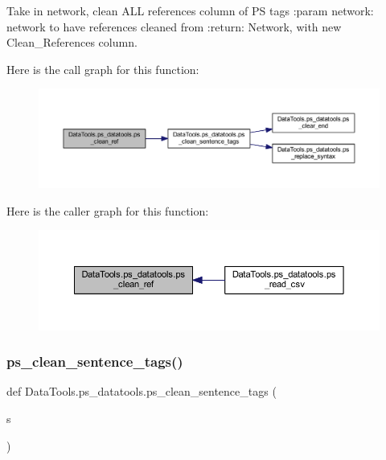\begin{DoxyVerb}Take in network, clean ALL references column of PS tags
:param network: network to have references cleaned from
:return: Network, with new Clean_References column.
\end{DoxyVerb}
 Here is the call graph for this function\+:
\nopagebreak
\begin{figure}[H]
\begin{center}
\leavevmode
\includegraphics[width=350pt]{namespace_data_tools_1_1ps__datatools_afefc36ca9e31fd7b3e2fc2126f9414bd_cgraph}
\end{center}
\end{figure}
Here is the caller graph for this function\+:
\nopagebreak
\begin{figure}[H]
\begin{center}
\leavevmode
\includegraphics[width=350pt]{namespace_data_tools_1_1ps__datatools_afefc36ca9e31fd7b3e2fc2126f9414bd_icgraph}
\end{center}
\end{figure}
\mbox{\label{namespace_data_tools_1_1ps__datatools_a9e2bdb845162499b6c7ef07092fa76e0}} 
\subsubsection{\texorpdfstring{ps\+\_\+clean\+\_\+sentence\+\_\+tags()}{ps\_clean\_sentence\_tags()}}
{\footnotesize\ttfamily def Data\+Tools.\+ps\+\_\+datatools.\+ps\+\_\+clean\+\_\+sentence\+\_\+tags (\begin{DoxyParamCaption}\item[{}]{s }\end{DoxyParamCaption})}

